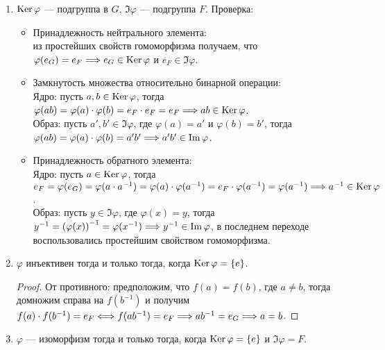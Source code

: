 \begin{properties}
    \begin{enumerate}
        \item $\operatorname{Ker} \varphi$ --- подгруппа в $G$, $\Im \varphi$ --- подгруппа $F$.
        Проверка:
        \begin{itemize}
            \item Принадлежность нейтрального элемента: \\ 
            из простейших свойств гомоморфизма получаем,
            что $\varphi(e_G) = e_F \Longrightarrow e_G \in \operatorname{Ker} \varphi$ и $e_F \in \Im \varphi$.
            \item Замкнутость множества относительно бинарной операции: \\ 
            Ядро: пусть $a, b \in \operatorname{Ker} \varphi$, тогда 
            $\varphi(ab) = \varphi(a) \cdot \varphi(b) = e_F \cdot e_F = e_F
            \Longrightarrow ab \in \operatorname{Ker} \varphi$. \\
            Образ: пусть $a', b' \in \Im \varphi$,
            где $\varphi(a) = a'$ и $\varphi(b) = b'$, 
            тогда $\varphi(ab) = \varphi(a) \cdot \varphi(b) = a'b' \Longrightarrow a'b' \in \operatorname{Im} \varphi$.
            \item Принадлежность обратного элемента: \\
            Ядро: пусть $a \in \operatorname{Ker} \varphi$, тогда
            $e_F = \varphi(e_G) = \varphi(a \cdot a^{-1}) = \varphi(a) \cdot \varphi(a^{-1}) =
            e_F \cdot \varphi(a^{-1}) = \varphi(a^{-1}) \Longrightarrow a^{-1} \in \operatorname{Ker} \varphi$.\\
            Образ: пусть $y \in \Im \varphi$, где $\varphi(x) = y$, тогда 
            $y^{-1} = \left( \varphi(x) \right)^{-1} = \varphi(x^{-1})
            \Longrightarrow y^{-1} \in \operatorname{Im} \varphi$, 
            в последнем переходе воспользовались простейшим свойством гомоморфизма.
        \end{itemize}
        \item $\varphi$ инъективен тогда и только тогда, когда $\operatorname{Ker} \varphi = \{e\}$.

        \begin{proof}
            От противного: предположим, что $f(a) = f(b)$, где $a \ne b$,
            тогда домножим справа на $f(b^{-1})$ и
            получим $f(a) \cdot f(b^{-1}) = e_F \Longleftrightarrow f(ab^{-1}) = e_F \Longrightarrow
            ab^{-1} = e_G \Longrightarrow a = b$.
        \end{proof}
        \item $\varphi$ --- изоморфизм тогда и только тогда, 
        когда $\operatorname{Ker} \varphi = \{e\}$ и $\Im \varphi = F$.
        

\end{enumerate}
\end{properties}
